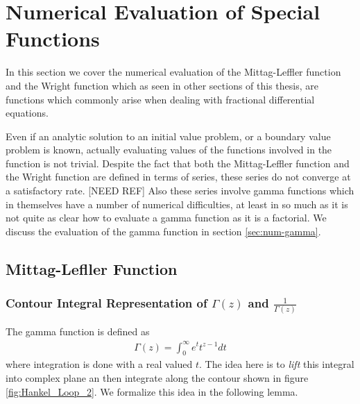 \section{Numerical Evaluation of Special Functions}

In this section we cover the numerical evaluation of the Mittag-Leffler function and the Wright function
which as seen in other sections of this thesis, are functions which commonly arise when dealing with
fractional differential equations.

Even if an analytic solution to an initial value problem, or a boundary value problem is known, actually
evaluating values of the functions involved in the function is not trivial. Despite the fact that both
the Mittag-Leffler function and the Wright function are defined in terms of series, these series do not 
converge at a satisfactory rate. [NEED REF] Also these series involve gamma functions which in themselves
have a number of numerical difficulties, at least in so much as it is not quite as clear how to evaluate 
a gamma function as it is a factorial. We discuss the evaluation of the gamma function in section \ref{sec:num-gamma}.


\subsection{Mittag-Lefller Function}
\subsubsection{Contour Integral Representation of $ \Gamma(z) $ and $ \frac{1}{\Gamma(z)} $}

The gamma function is defined as
\begin{align}
    \Gamma(z) = \int_0^\infty e^t t^{z-1} dt
\end{align}
where integration is done with a real valued $ t $. The idea here is to \emph{lift} this integral into
complex plane an then integrate along the contour shown in figure \ref{fig:Hankel_Loop_2}. We formalize 
this idea in the following lemma.


